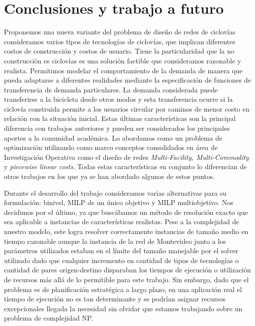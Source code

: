 \chapter{Conclusiones y trabajo a futuro}

Proponemos una nueva variante del problema de diseño de redes de ciclovías consideramos varios tipos de tecnologías de ciclovías, que implican diferentes costos de construcción y costos de usuario. Tiene la particularidad que la no construcción es ciclovías es una solución factible que consideramos razonable y realista. Permitimos modelar el comportamiento de la demanda de manera que pueda adaptarse a diferentes realidades mediante la especificación de funciones de transferencia de demanda particulares. La demanda considerada puede transferirse a la bicicleta desde otros modos y esta transferencia ocurre si la ciclovía construida permite a los usuarios circular por caminos de menor costo en relación con la situación inicial. Estas últimas características son la principal diferencia con trabajos anteriores y pueden ser considerados los principales aportes a la comunidad académica. Lo abordamos como un problema de optimización utilizando como marco conceptos consolidados en área de Investigación Operativa como el diseño de redes {\it Multi-Facility, Multi-Commodity} y {\it piecewise linear costs}. Todas estas características en conjunto lo diferencian de otros trabajos en los que ya se han abordado algunos de estos puntos.

Durante el desarrollo del trabajo consideramos varias alternativas para su formulación: binivel, MILP de un único objetivo y MILP multiobjetivo. Nos decidimos por el último, ya que buscábamos un método de resolución exacto que sea aplicable a instancias de características realistas. Pese a la complejidad de nuestro modelo, este logra resolver correctamente instancias de tamaño medio en tiempo razonable aunque la instancia de la red de Montevideo junto a los parámetros utilizados estaban en el límite del tamaño manejable por el solver utilizado dado que cualquier incremento en cantidad de tipos de tecnologías o cantidad de pares origen-destino disparaban los tiempos de ejecución o utilización de recursos más allá de lo permitible para este trabajo. Sin embargo, dado que el problema es de planificación estratégica a largo plazo, en una aplicación real el tiempo de ejecución no es tan determinante y se podrían asignar recursos excepcionales llegada la necesidad sin olvidar que estamos trabajando sobre un problema de complejidad NP.

